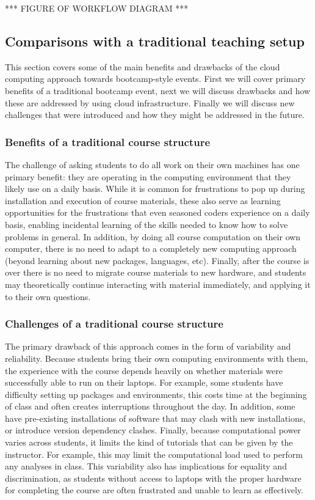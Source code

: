 *** FIGURE OF WORKFLOW DIAGRAM ***

\subsection{Comparisons with a traditional teaching setup}

This section covers some of the main benefits and drawbacks of the cloud
computing approach towards bootcamp-style events. First we will cover primary
benefits of a traditional bootcamp event, next we will discuss drawbacks and how
these are addressed by using cloud infrastructure. Finally we will discuss new
challenges that were introduced and how they might be addressed in the future.

\subsubsection{Benefits of a traditional course structure}

The challenge of asking students to do all work on their own machines has one
primary benefit: they are operating in the computing environment that they
likely use on a daily basis. While it is common for frustrations to pop up
during installation and execution of course materials, these also serve as
learning opportunities for the frustrations that even seasoned coders experience
on a daily basis, enabling incidental learning of the skills needed to know how
to solve problems in general. In addition, by doing all course computation on
their own computer, there is no need to adapt to a completely new computing
approach (beyond learning about new packages, languages, etc). Finally, after
the course is over there is no need to migrate course materials to new hardware,
and students may theoretically continue interacting with material immediately,
and applying it to their own questions.

\subsubsection{Challenges of a traditional course structure}

The primary drawback of this approach comes in the form of variability and
reliability. Because students bring their own computing environments with them,
the experience with the course depends heavily on whether materials were
successfully able to run on their laptops. For example, some students have
difficulty setting up packages and environments, this costs time at the
beginning of class and often creates interruptions throughout the day. In
addition, some have pre-existing installations of software that may clash with
new installations, or introduce version dependency clashes. Finally, because
computational power varies across students, it limits the kind of tutorials that
can be given by the instructor. For example, this may limit the computational
load used to perform any analyses in class. This variability also has
implications for equality and discrimination, as students without access to
laptops with the proper hardware for completing the course are often frustrated
and unable to learn as effectively.

